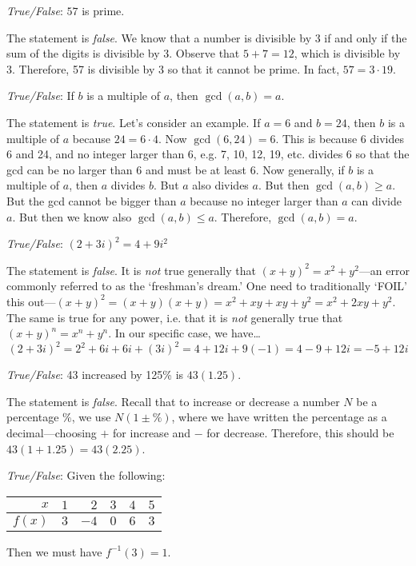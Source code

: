 \documentclass[11pt,letterpaper]{article}
\begin{document}
\thispagestyle{title}

\quizsol \textit{True/False}: $57$ is prime. \pspace

\sol The statement is \textit{false}. We know that a number is divisible by 3 if and only if the sum of the digits is divisible by 3. Observe that $5 + 7= 12$, which is divisible by 3. Therefore, 57 is divisible by 3 so that it cannot be prime. In fact, $57= 3 \cdot 19$. \pvspace{1.5cm}



\quizsol \textit{True/False}: If $b$ is a multiple of $a$, then $\gcd(a, b)= a$. \pspace

\sol The statement is \textit{true}. Let's consider an example. If $a= 6$ and $b= 24$, then $b$ is a multiple of $a$ because $24= 6 \cdot 4$. Now $\gcd(6, 24)= 6$. This is because 6 divides 6 and 24, and no integer larger than 6, e.g. 7, 10, 12, 19, etc. divides 6 so that the gcd can be no larger than 6 and must be at least 6. Now generally, if $b$ is a multiple of $a$, then $a$ divides $b$. But $a$ also divides $a$. But then $\gcd(a, b) \geq a$. But the gcd cannot be bigger than $a$ because no integer larger than $a$ can divide $a$. But then we know also $\gcd(a, b) \leq a$. Therefore, $\gcd(a, b)= a$. \pvspace{1.5cm}



\quizsol \textit{True/False}: $(2 + 3i)^2= 4 + 9i^2$ \pspace

\sol The statement is \textit{false}. It is \textit{not} true generally that $(x + y)^2= x^2 + y^2$---an error commonly referred to as the `freshman's dream.' One need to traditionally `FOIL' this out---$(x+ y)^2= (x + y)(x + y)= x^2 + xy + xy + y^2= x^2 + 2xy + y^2$. The same is true for any power, i.e. that it is \textit{not} generally true that $(x + y)^n= x^n + y^n$. In our specific case, we have\dots
	\[
	(2 + 3i)^2= 2^2 + 6i + 6i + (3i)^2= 4 + 12i + 9(-1)= 4 - 9 + 12i= -5 + 12i
	\] \pvspace{1.5cm}



\quizsol \textit{True/False}: 43 increased by 125\% is $43(1.25)$. \pspace

\sol The statement is \textit{false}. Recall that to increase or decrease a number $N$ be a percentage $\%$, we use $N(1 \pm \%)$, where we have written the percentage as a decimal---choosing $+$ for increase and $-$ for decrease. Therefore, this should be $43(1 + 1.25)= 43(2.25)$. \pvspace{1.5cm}



\quizsol \textit{True/False}: Given the following:
	\begin{table}[!ht]
	\centering
	\begin{tabular}{r|rrrrr}
	$x$ & $1$ & $2$ & $3$ & $4$ & $5$ \\ \hline
	$f(x)$ & $3$ & $-4$ & $0$ & $6$ & $3$
	\end{tabular}
	\end{table} 
Then we must have $f^{-1}(3)= 1$. \pspace
\end{document}
